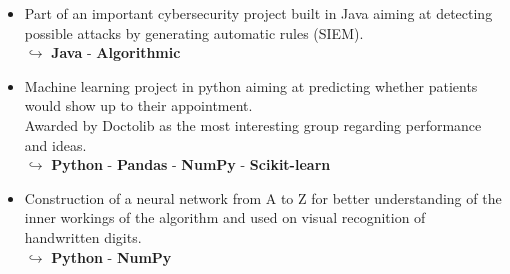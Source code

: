 \documentclass[9pt,a4paper,ragged2e]{altacv}
\begin{document}



\divider
{}
\begin{itemize}
	\item Part of an important cybersecurity project built in Java aiming at detecting possible attacks by generating automatic rules (SIEM).\\
  $\hookrightarrow$ \textbf{Java} - \textbf{Algorithmic}
\end{itemize}
\begin{itemize}
	\item Machine learning project in python aiming at predicting whether patients would show up to their appointment. \\Awarded by Doctolib as the most interesting group regarding performance and ideas.\\
  $\hookrightarrow$ \textbf{Python} - \textbf{Pandas} - \textbf{NumPy} - \textbf{Scikit-learn}
\end{itemize}
\begin{itemize}
	\item Construction of a neural network from A to Z for better understanding of the inner workings of the algorithm and used on visual recognition of \\handwritten digits. \\
  $\hookrightarrow$ \textbf{Python} - \textbf{NumPy}
\end{itemize}
\end{document}
